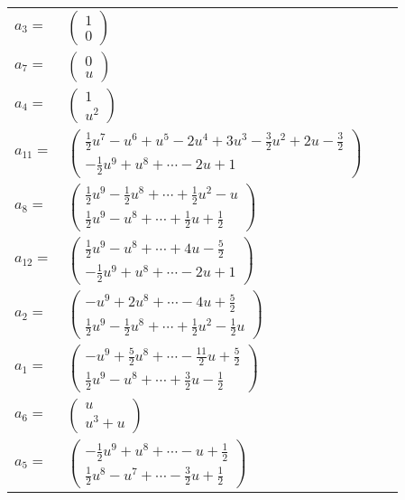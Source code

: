 \documentclass[1p]{elsarticle_modified}
\theoremstyle{definition}
\begin{document}
\begin{tabular}{m{7pt} m{180pt} m{7pt} m{180pt} }
\flushright $a_{3}=$&$\begin{pmatrix}1\\0\end{pmatrix}$ \\
\flushright $a_{7}=$&$\begin{pmatrix}0\\u\end{pmatrix}$ \\
\flushright $a_{4}=$&$\begin{pmatrix}1\\u^2\end{pmatrix}$ \\
\flushright $a_{11}=$&$\begin{pmatrix}\frac{1}{2} u^7- u^6+u^5-2 u^4+3 u^3-\frac{3}{2} u^2+2 u-\frac{3}{2}\\-\frac{1}{2} u^9+u^8+\cdots-2 u+1\end{pmatrix}$ \\
\flushright $a_{8}=$&$\begin{pmatrix}\frac{1}{2} u^9-\frac{1}{2} u^8+\cdots+\frac{1}{2} u^2- u\\\frac{1}{2} u^9- u^8+\cdots+\frac{1}{2} u+\frac{1}{2}\end{pmatrix}$ \\
\flushright $a_{12}=$&$\begin{pmatrix}\frac{1}{2} u^9- u^8+\cdots+4 u-\frac{5}{2}\\-\frac{1}{2} u^9+u^8+\cdots-2 u+1\end{pmatrix}$ \\
\flushright $a_{2}=$&$\begin{pmatrix}- u^9+2 u^8+\cdots-4 u+\frac{5}{2}\\\frac{1}{2} u^9-\frac{1}{2} u^8+\cdots+\frac{1}{2} u^2-\frac{1}{2} u\end{pmatrix}$ \\
\flushright $a_{1}=$&$\begin{pmatrix}- u^9+\frac{5}{2} u^8+\cdots-\frac{11}{2} u+\frac{5}{2}\\\frac{1}{2} u^9- u^8+\cdots+\frac{3}{2} u-\frac{1}{2}\end{pmatrix}$ \\
\flushright $a_{6}=$&$\begin{pmatrix}u\\u^3+u\end{pmatrix}$ \\
\flushright $a_{5}=$&$\begin{pmatrix}-\frac{1}{2} u^9+u^8+\cdots- u+\frac{1}{2}\\\frac{1}{2} u^8- u^7+\cdots-\frac{3}{2} u+\frac{1}{2}\end{pmatrix}$ \\

\end{tabular}
\end{document}
